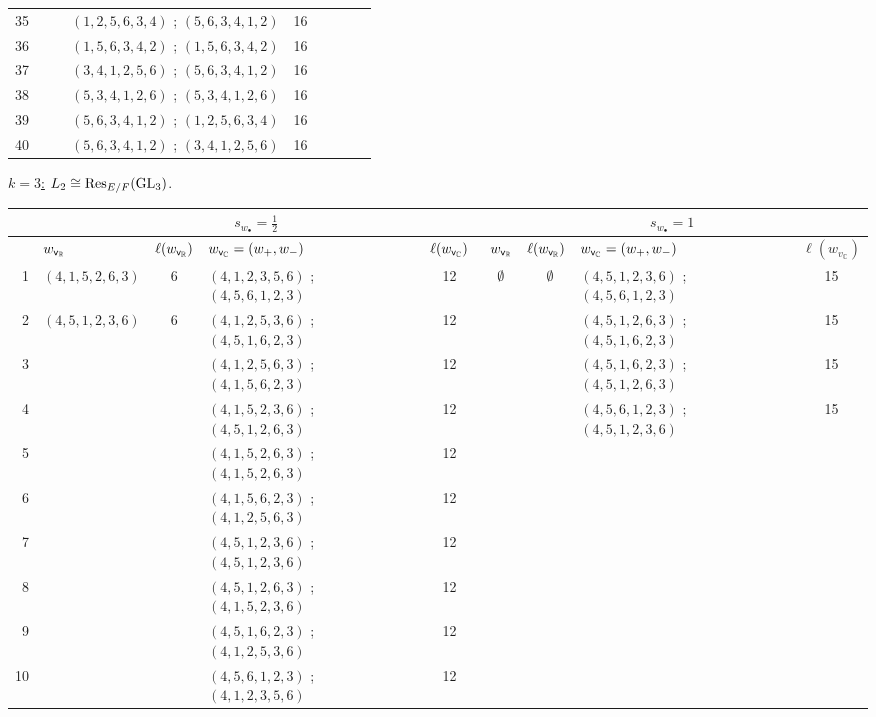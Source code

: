 \documentclass[a4paper,10pt]{amsart}
\theoremstyle{definition}
\numberwithin{equation}{section}
\def\GL{{\rm GL}}
\def\vv{{\sf v}} %
\begin{document}
\begin{center}
\begin{longtable}{r p{1.78cm} c p{4cm} c | p{1.78cm} c p{4.15cm} c}
35 &  &  & $(1,2,5,6,3,4)$ ; $(5,6,3,4,1,2)$ & 16 &  &  &  &  \\
36 &  &  & $(1,5,6,3,4,2)$ ; $(1,5,6,3,4,2)$ & 16 &  &  &  &  \\
37 &  &  & $(3,4,1,2,5,6)$ ; $(5,6,3,4,1,2)$ & 16 &  &  &  &  \\
38 &  &  & $(5,3,4,1,2,6)$ ; $(5,3,4,1,2,6)$ & 16 &  &  &  &  \\
39 &  &  & $(5,6,3,4,1,2)$ ; $(1,2,5,6,3,4)$ & 16 &  &  &  &  \\
40 &  &  & $(5,6,3,4,1,2)$ ; $(3,4,1,2,5,6)$ & 16 &  &  &  &  \\
\bottomrule
\end{longtable}
\end{center}\small
\underline{$k=3$:} $L_2\cong {\rm Res}_{E/F}(\GL_3)$. 
\begin{center}
\tiny
\setlength{\tabcolsep}{2pt}\renewcommand{\arraystretch}{1.06}
\begin{longtable}{r p{1.78cm} c p{4cm} c | p{1.78cm} c p{4.15cm} c}
\toprule
& \multicolumn{4}{c|}{$s_{w_\bullet}=\frac12$} & \multicolumn{4}{c}{$s_{w_\bullet}=1$}\\
\midrule
& \(w_{\vv_{\mathbb R}}\)  & $\ell(w_{\vv_{\mathbb R}} )$ & \quad $w_{\vv_{\mathbb C}}=(w_+, w_-)$ & $\ell(w_{\vv_{\mathbb C}})$ & \ \(w_{\vv_{\mathbb R}}\)  & $\ell(w_{\vv_{\mathbb R}} )$ & \quad $w_{\vv_{\mathbb C}}=(w_+, w_-)$ & \(\ell(w_{v_{\mathbb C}})\)\\
\midrule
\endhead
1 & $(4,1,5,2,6,3)$ & 6 & $(4,1,2,3,5,6)$ ; $(4,5,6,1,2,3)$ & 12 &  \ \  $\emptyset$ &  \  $\emptyset$& $(4,5,1,2,3,6)$ ; $(4,5,6,1,2,3)$ & 15 \\
2 & $(4,5,1,2,3,6)$ & 6 & $(4,1,2,5,3,6)$ ; $(4,5,1,6,2,3)$ & 12 &  &  & $(4,5,1,2,6,3)$ ; $(4,5,1,6,2,3)$ & 15 \\
3 &  &  & $(4,1,2,5,6,3)$ ; $(4,1,5,6,2,3)$ & 12 &  &  & $(4,5,1,6,2,3)$ ; $(4,5,1,2,6,3)$ & 15 \\
4 &  &  & $(4,1,5,2,3,6)$ ; $(4,5,1,2,6,3)$ & 12 &  &  & $(4,5,6,1,2,3)$ ; $(4,5,1,2,3,6)$ & 15 \\
5 &  &  & $(4,1,5,2,6,3)$ ; $(4,1,5,2,6,3)$ & 12 &  &  &  &  \\
6 &  &  & $(4,1,5,6,2,3)$ ; $(4,1,2,5,6,3)$ & 12 &  &  &  &  \\
7 &  &  & $(4,5,1,2,3,6)$ ; $(4,5,1,2,3,6)$ & 12 &  &  &  &  \\
8 &  &  & $(4,5,1,2,6,3)$ ; $(4,1,5,2,3,6)$ & 12 &  &  &  &  \\
9 &  &  & $(4,5,1,6,2,3)$ ; $(4,1,2,5,3,6)$ & 12 &  &  &  &  \\
10 &  &  & $(4,5,6,1,2,3)$ ; $(4,1,2,3,5,6)$ & 12 &  &  &  &  \\
\bottomrule
\end{longtable}
\end{center} 
\end{document}
